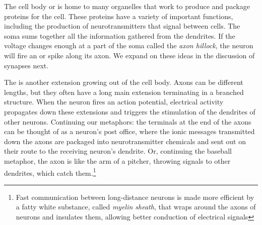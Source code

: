 The cell body or  is home to many organelles that work to produce and package proteins for the cell. These proteins have a variety of important functions, including the production of neurotransmitters that signal between cells. The soma sums together all the information gathered from the dendrites. If the voltage changes enough at a part of the soma called the \emph{axon hillock}, the neuron will fire an  or spike along its axon. We expand on these ideas in the discussion of synapses next. 

The  is another extension growing out of the cell body. Axons can be different lengths, but they often have a long main extension terminating in a branched structure. When the neuron fires an action potential, electrical activity propagates down these extensions and triggers the stimulation of the dendrites of other neurons. Continuing our metaphors: the terminals at the end of the axons can be thought of as a neuron's post office, where the ionic messages transmitted down the axons are packaged into neurotransmitter chemicals and sent out on their route to the receiving neuron's dendrite. Or, continuing the baseball metaphor, the axon is like the arm of a pitcher, throwing signals to other dendrites, which catch them.\footnote{Fast communication between long-distance neurons is made more efficient by a fatty white substance, called \emph{myelin sheath}, that wraps around the axons of neurons and insulates them, allowing better conduction of electrical signals}


